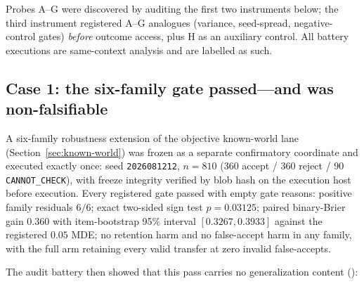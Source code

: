 Probes A--G were discovered by auditing the first two instruments below; the third instrument registered A--G analogues (variance, seed-spread, negative-control gates) \emph{before} outcome access, plus H as an auxiliary control. All battery executions are same-context analysis and are labelled as such.

\subsection{Case 1: the six-family gate passed---and was non-falsifiable}
\label{sec:six-family}

A six-family robustness extension of the objective known-world lane (Section~\ref{sec:known-world}) was frozen as a separate confirmatory coordinate and executed exactly once: seed \texttt{2026081212}, $n=810$ (360 accept / 360 reject / 90 \texttt{CANNOT\_CHECK}), with freeze integrity verified by blob hash on the execution host before execution. Every registered gate passed with empty gate reasons: positive family residuals $6/6$; exact two-sided sign test $p=0.03125$; paired binary-Brier gain $0.360$ with item-bootstrap 95\% interval $[0.3267,0.3933]$ against the registered $0.05$ MDE; no retention harm and no false-accept harm in any family, with the full arm retaining every valid transfer at zero invalid false-accepts.

The audit battery then showed that this pass carries no generalization content ():

